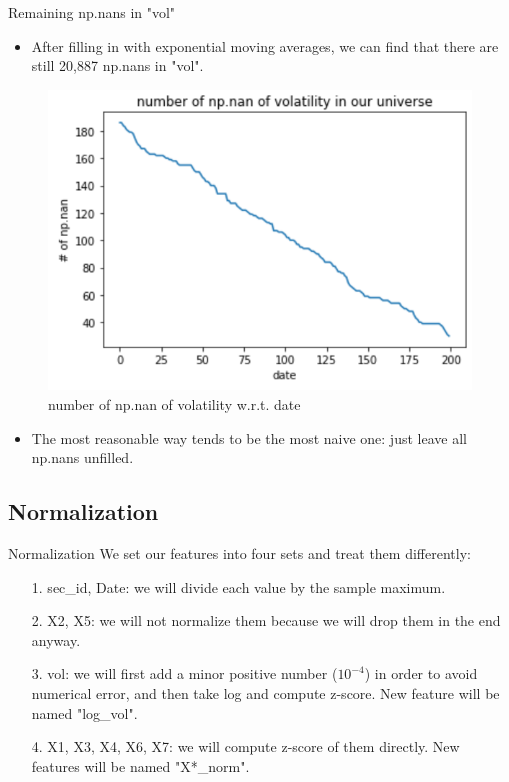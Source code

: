 \documentclass{beamer}
\begin{document}
\begin{frame}{Remaining np.nans in "vol"}
\begin{itemize}
    \item After filling in with exponential moving averages, we can find that there are still 20,887 np.nans in "vol".
\end{itemize}

\begin{figure}[ht]
\centering
\includegraphics[scale=0.6]{num_of_nan.PNG}
\caption{number of np.nan of volatility w.r.t. date}
\label{fig:label}
\end{figure}

\begin{itemize}
    \item The most reasonable way tends to be the most naive one: just leave all np.nans unfilled.
\end{itemize}
\end{frame}

\subsection{Normalization}
\begin{frame}{Normalization}
 We set our features into four sets and treat them differently:
\begin{itemize}
    \item[1.] sec\_id, Date: we will divide each value by the sample maximum.
    \item[2.] X2, X5: we will not normalize them because we will drop them in the end anyway.
    \item[3.] vol: we will first add a minor positive number ($10^{-4}$) in order to avoid numerical error, and then take log and compute z-score. New feature will be named "log\_vol".
    \item[4.] X1, X3, X4, X6, X7: we will compute z-score of them directly. New features will be named "X*\_norm".
\end{itemize}
\end{frame}
\end{document}
